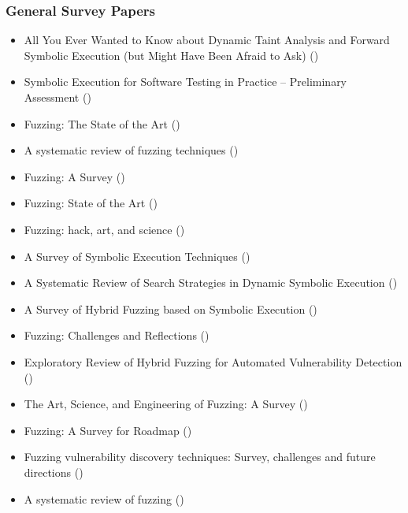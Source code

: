 \documentclass{article}
\begin{document}
\subsubsection{General Survey Papers}
\begin{itemize}
    \item    All You Ever Wanted to Know about Dynamic Taint Analysis and Forward Symbolic Execution (but Might Have Been Afraid to Ask) (\citeyear{AllYouEverWanted})\cite{AllYouEverWanted}
    \item    Symbolic Execution for Software Testing in Practice – Preliminary Assessment (\citeyear{PreliminaryAssessment})\cite{PreliminaryAssessment}
    \item    Fuzzing: The State of the Art (\citeyear{FuzzingTheStateOfTheArt})\cite{FuzzingTheStateOfTheArt}
    \item    A systematic review of fuzzing techniques (\citeyear{Science})\cite{Science}
    \item    Fuzzing: A Survey (\citeyear{FuzzingASurvey})\cite{FuzzingASurvey}
    \item    Fuzzing: State of the Art (\citeyear{FuzzingStateOfTheArt2018})\cite{FuzzingStateOfTheArt2018}
    \item    Fuzzing: hack, art, and science (\citeyear{HackArtScience})\cite{HackArtScience}
    \item A Survey of Symbolic Execution Techniques (\citeyear{SurveySymbex})\cite{SurveySymbex}
    \item    A Systematic Review of Search Strategies in Dynamic Symbolic Execution (\citeyear{SearchStrategies})\cite{SearchStrategies}
    \item A Survey of Hybrid Fuzzing based on Symbolic Execution (\citeyear{SurveyHybrid})\cite{SurveyHybrid}
    \item    Fuzzing: Challenges and Reflections (\citeyear{ChallengesAndReflections})\cite{ChallengesAndReflections}
    \item    Exploratory Review of Hybrid Fuzzing for Automated Vulnerability Detection (\citeyear{Hybrid})\cite{Hybrid}
    \item    The Art, Science, and Engineering of Fuzzing: A Survey (\citeyear{ArtScienceEngineeringFuzzing})\cite{ArtScienceEngineeringFuzzing}
    \item    Fuzzing: A Survey for Roadmap (\citeyear{FuzzingASurveyforRoadmap})\cite{FuzzingASurveyforRoadmap}
    \item    Fuzzing vulnerability discovery techniques: Survey, challenges and future directions (\citeyear{FuzzingVulnerabilityDiscoveryTechniques})\cite{FuzzingVulnerabilityDiscoveryTechniques}
    \item    A systematic review of fuzzing (\citeyear{SystematicReview2023})\cite{SystematicReview2023}
\end{itemize}
\end{document}
